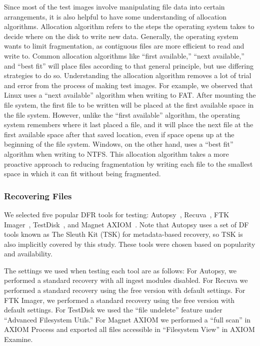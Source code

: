 Since most of the test images involve manipulating file data into certain arrangements, it is also helpful to have some understanding of allocation algorithms.
Allocation algorithm refers to the steps the operating system takes to decide where on the disk to write new data.
Generally, the operating system wants to limit fragmentation, as contiguous files are more efficient to read and write to.
Common allocation algorithms like ``first available,'' ``next available,'' and ``best fit'' will place files according to that general principle, but use differing strategies to do so.
Understanding the allocation algorithm removes a lot of trial and error from the process of making test images.
For example, we observed that Linux uses a ``next available'' algorithm when writing to FAT.
After mounting the file system, the first file to be written will be placed at the first available space in the file system.
However, unlike the ``first available'' algorithm, the operating system remembers where it last placed a file, and it will place the next file at the first available space after that saved location, even if space opens up at the beginning of the file system.
Windows, on the other hand, uses a ``best fit'' algorithm when writing to NTFS.
This allocation algorithm takes a more proactive approach to reducing fragmentation by writing each file to the smallest space in which it can fit without being fragmented.


\subsubsection{Recovering Files}
\begin{paraphrase}
 We selected five popular DFR tools for testing: Autopsy~\cite{autopsy}, Recuva~\cite{recuva}, FTK Imager~\cite{ftk}, TestDisk~\cite{testdisk}, and Magnet AXIOM~\cite{axiom_meta}. 
Note that Autopsy uses a set of DF tools known as The Sleuth Kit (TSK) for metadata-based recovery, so TSK is also implicitly covered by this study. 
These tools were chosen based on popularity and availability.

The settings we used when testing each tool are as follows:
For Autopsy, we performed a standard recovery with all ingest modules disabled.
For Recuva we performed a standard recovery using the free version with default settings.
For FTK Imager, we performed a standard recovery using the free version with default settings.
For TestDisk we used the ``file undelete'' feature under ``Advanced Filesystem Utils.''
For Magnet AXIOM we performed a ``full scan'' in AXIOM Process and exported all files accessible in ``Filesystem View'' in AXIOM Examine.
\end{paraphrase}

